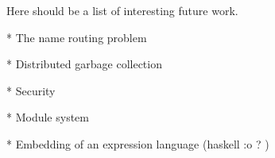 
Here should be a list of interesting future work.

* The name routing problem

* Distributed garbage collection

* Security

* Module system

* Embedding of an expression language (haskell :o ? )
